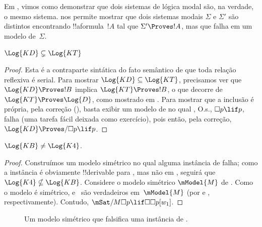 \documentclass[../../../include/open-logic-section]{subfiles}
\begin{document}


Em , vimos como demonstrar que dois sistemas de lógica
modal são, na verdade, o mesmo sistema.  nos
permite mostrar que dois sistemas modais $\Sigma$ e $\Sigma'$ são
distintos encontrando !!a{formula}~$!A$ tal que $\Sigma' \Proves !A$,
mas que falha em um modelo de~$\Sigma$.

\begin{prop}
  $\Log{KD} \subsetneq \Log{KT}$
\end{prop}

\begin{proof} Esta é a contraparte sintática do fato semântico de que
  toda relação reflexiva é serial. Para mostrar $\Log{KD} \subseteq
  \Log{KT}$, precisamos ver que $\Log{KD} \Proves !B$ implica
  $\Log{KT} \Proves !B$, o que decorre de $\Log{KT} \Proves
  \Log{D}$, como mostrado em
  . Para mostrar
  que a inclusão é própria, pela correção
  (), basta exibir um modelo de  no
  qual , O.s.\@, $\Box p \lif p$, falha (uma tarefa fácil deixada
  como exercício), pois então, pela correção, $\Log{KD}
  \Proves/ \Box p \lif p$.
\end{proof}

\begin{prop}
  $\Log{KB} \neq \Log{K4}$. 
\end{prop}

\begin{proof}
  Construímos um modelo simétrico no qual alguma instância de 
  falha; como a instância é obviamente !!{derivable} para ,
  mas não em , seguirá que $\Log{K4} \nsubseteq \Log{KB}$.
  Considere o modelo simétrico $\mModel{M}$ de . Como
  o modelo é simétrico,  e~ são verdadeiros em~$\mModel{M}$
  (por  e
  , respectivamente). Contudo,
  $\mSat/{M}{\Box p \lif \Box\Box p}[w_1]$.
\end{proof}

\begin{figure}[htpb]
  \centering
  \caption{Um modelo simétrico que falsifica uma instância de .}
\end{figure}
 
\end{document}
